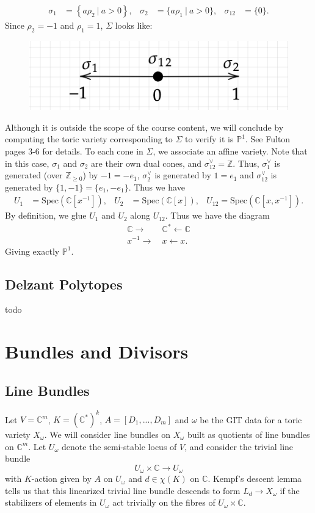 \documentclass{article}
\theoremstyle{definition}
\theoremstyle{remark}
\numberwithin{theorem}{section}
\newcommand{\C}{\mathbb{C}}
\newcommand{\Z}{\mathbb{Z}}
\newcommand{\bP}{\mathbb{P}}
\newcommand{\Spec}{\text{Spec}}
\begin{document}
	\begin{align*}
	\sigma_1 &= \left\{ a \rho_2 ~|~ a>0 \right\}, & \sigma_2 &= \{ a\rho_1 ~|~ a>0 \}, & \sigma_{12} &= \{0\}.
	\end{align*}
	Since $\rho_2=-1$ and $\rho_1 =1$, $\Sigma$ looks like: 
	\begin{figure}[h]
		\centering
		\includegraphics[width=0.8\linewidth]{p1fan.png}
	\end{figure}
	\vspace{1em}

	Although it is outside the scope of the course content, we will conclude by computing the toric variety corresponding to $\Sigma$ to verify it is $\bP^1$. See Fulton pages 3-6 for details. To each cone in $\Sigma$, we associate an affine variety. Note that in this case, $\sigma_1$ and $\sigma_2$ are their own dual cones, and $\sigma_{12}^\vee = \Z$. Thus, $\sigma_1^\vee$ is generated (over $\Z_{\geq 0}$) by $-1=-e_1$, $\sigma_2^\vee$ is generated by $1=e_1$ and $\sigma_{12}^\vee$ is generated by $\{1,-1\} =\{e_1,-e_1\}$. Thus we have
	\begin{align*}
		U_1 &= \Spec(\C[x^{-1}]), & U_2 &= \Spec(\C[x]), & U_{12} = \Spec(\C[x,x^{-1}]).
	\end{align*}
	By definition, we glue $U_1$ and $U_2$ along $U_{12}$. Thus we have the diagram
	\begin{align*}
		\C \rightarrow &~\C^\ast \leftarrow \C\\
		x^{-1} \rightarrow &~x \leftarrow x.
	\end{align*}
	Giving exactly $\bP^1$.

	\subsection{Delzant Polytopes}
	todo 

	\section{Bundles and Divisors}
	\subsection{Line Bundles}
	Let $V=\C^m$, $K = (\C^\ast)^k$, $A=[D_1,...,D_m]$ and $\omega$ be the GIT data for a toric variety $X_\omega$. We will consider line bundles on $X_\omega$ built as quotients of line bundles on $\C^m$. Let $U_\omega$ denote the semi-stable locus of $V$, and consider the trivial line bundle
	$$U_\omega \times \C \to U_\omega$$
	with $K$-action given by $A$ on $U_\omega$ and $d\in \chi(K)$ on $\C$. Kempf's descent lemma tells us that this linearized trivial line bundle descends to form $L_d\to X_\omega$ if the stabilizers of elements in $U_\omega$ act trivially on the fibres of $U_\omega\times \C$. \vspace{1em}
\end{document}
